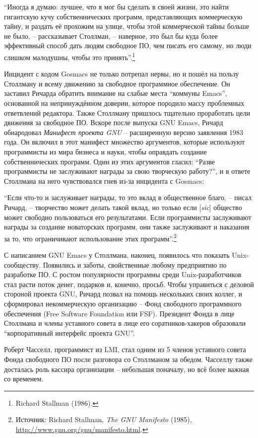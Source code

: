 \enquote{Иногда я думаю: лучшее, что я мог бы сделать в своей жизни, это найти гигантскую кучу собственнических программ, представляющих коммерческую тайну, и раздать её прохожим на улице, чтобы этой коммерческой тайны больше не было, -- рассказывает Столлман, -- наверное, это был бы куда более эффективный способ дать людям свободное ПО, чем писать его самому, но люди слишком малодушны, чтобы это принять}.\footnote{Richard Stallman (1986).}

Инцидент с кодом Gosmacs не только потрепал нервы, но и пошёл на пользу Столлману и всему движению за свободное программное обеспечение. Он заставил Ричарда обратить внимание на слабые места \enquote{коммуны Emacs}, основанной на непринуждённом доверии, которое породило массу проблемных ответвлений редактора. Также Столлману пришлось тщательно проработать цели движения за свободное ПО. Вскоре после выпуска GNU Emacs, Ричард обнародовал \textit{Манифест проекта GNU} -- расширенную версию заявления 1983 года. Он включил в этот манифест множество аргументов, которые используют программисты из мира бизнеса и науки, чтобы оправдать создание собственнических программ. Один из этих аргументов гласил: \enquote{Разве программисты не заслуживают награды за свою творческую работу?}, и в ответе Столлмана на него чувствовался гнев из-за инцидента с Gosmacs:

\enquote{Если что-то и заслуживает награды, то это вклад в общественное благо, -- писал Ричард, -- творчество может делать такой вклад, но только если [\textit{sic}] общество может свободно пользоваться его результатами. Если программисты заслуживают награды за создание новаторских программ, они также заслуживают и наказания за то, что ограничивают использование этих программ}.\footnote{Источник: Richard Stallman, \textit{The GNU Manifesto} (1985), \url{http://www.gnu.org/gnu/manifesto.html}.}

С написанием GNU Emacs у Столлмана, наконец, появилось что показать Unix-сообществу. Появились и заботы, свойственные любому предприятию по разработке ПО. С ростом популярности программы среди Unix-разработчиков стал расти поток денег, подарков и, конечно, просьб. Чтобы управиться с деловой стороной проекта GNU, Ричард позвал на помощь нескольких своих коллег, и сформировал некоммерческую организацию -- Фонд свободного программного обеспечения (Free Software Foundation или FSF). Президент Фонда в лице Столлмана и члены уставного совета в лице его соратников-хакеров образовали \enquote{корпоративный интерфейс проекта GNU}.

Роберт Часселл, программист из LMI, стал одним из 5 членов уставного совета Фонда свободного ПО после разговора со Столлманом за обедом. Часселлу также досталась роль кассира организации -- небольшая поначалу, но всё более важная со временем.

